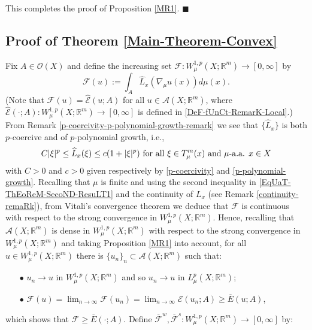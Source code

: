 \documentclass[10pt]{amsart}
\numberwithin{equation}{section}
\theoremstyle{definition}
\theoremstyle{remark}
\begin{document}
\medskip

This completes the proof of Proposition \ref{MR1}. $\blacksquare$

\subsection{Proof of Theorem \ref{Main-Theorem-Convex}} Fix $A\in\mathcal{O}(X)$ and define the increasing set $\mathcal{F}:W^{1,p}_\mu(X;{{\mathbb R}}^m)\to[0,\infty]$ by
\begin{equation}\label{NeW-FunCtiONAL}
\mathcal{F}(u):=\int_A\widehat{L}_x(\nabla_\mu u(x))d\mu(x).
\end{equation}
(Note that $\mathcal{F}(u)=\widehat{\mathcal{E}}(u;A)$ for all $u\in\mathcal{A}(X;{{\mathbb R}}^m)$, where $\widehat{\mathcal{E}}(\cdot;A):W^{1,p}_\mu(X;{{\mathbb R}}^m)\to[0,\infty]$ is defined in \eqref{DeF-fUnCt-RemarK-Local}.) From Remark \ref{p-coercivity-p-polynomial-growth-remark} we see that $\{\widehat{L}_x\}$ is both $p$-coercive and of $p$-polynomial growth, i.e.,
\begin{equation}\label{EqUaT-ThEoReM-SecoND-ResuLT1}
C|\xi|^p\leq\widehat{L}_x(\xi)\leq c(1+|\xi|^p)\hbox{ for all }\xi\in T^m_\mu(x)\hbox{ and $\mu$-a.a. }x\in X
\end{equation}
with $C>0$ and $c>0$ given respectively by \eqref{p-coercivity} and \eqref{p-polynomial-growth}. Recalling that $\mu$ is finite and using the second inequality in \eqref{EqUaT-ThEoReM-SecoND-ResuLT1} and the continuity of $L_x$ (see Remark \ref{continuity-remaRk}), from Vitali's convergence theorem we deduce that $\mathcal{F}$ is continuous with respect to the strong convergence in $W^{1,p}_\mu(X;{{\mathbb R}}^m)$. Hence, recalling that $\mathcal{A}(X;{{\mathbb R}}^m)$ is dense in $W^{1,p}_\mu(X;{{\mathbb R}}^m)$ with respect to the strong convergence in $W^{1,p}_\mu(X;{{\mathbb R}}^m)$ and taking Proposition \ref{MR1} into account, for all $u\in W^{1,p}_\mu(X;{{\mathbb R}}^m)$ there is $\{u_n\}_n\subset \mathcal{A}(X;{{\mathbb R}}^m)$ such that:
\begin{itemize}
\item[$\bullet$] $u_n\to u$ in $W^{1,p}_\mu(X;{{\mathbb R}}^m)$ and so $u_n\to u$ in $L^p_\mu(X;{{\mathbb R}}^m)$;
\item[$\bullet$] $\mathcal{F}(u)=\lim_{n\to\infty}\mathcal{F}(u_n)=\lim_{n\to\infty}\widehat{\mathcal{E}}(u_n;A)\geq\overline{E}(u;A)$,
\end{itemize}
which shows that $\mathcal{F}\geq \overline{E}(\cdot;A)$. Define $\overline{\mathcal{F}}^w,\overline{\mathcal{F}}^s:W^{1,p}_\mu(X;{{\mathbb R}}^m)\to[0,\infty]$ by:
\end{document}
